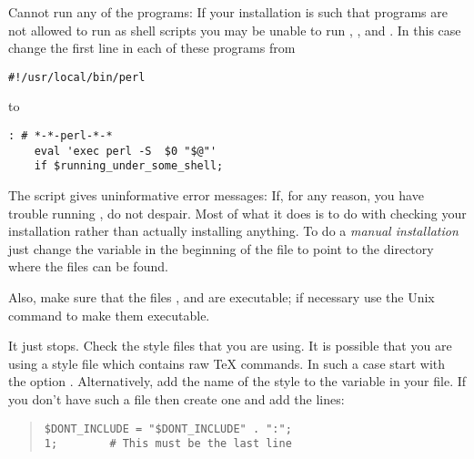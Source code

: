 \begin{htmllist}
\item [Cannot run any of the \Perl{} programs: ]
If your \Perl{} installation is such that \Perl{} programs are not allowed
to run as shell scripts you may be unable to run
, ,  and  .
In this case change the first line in each of these
programs from
\begin{small}
\begin{verbatim}
#!/usr/local/bin/perl
\end{verbatim}
\end{small}%
to
\begin{small}%
\begin{verbatim}
: # *-*-perl-*-*
    eval 'exec perl -S  $0 "$@"'
    if $running_under_some_shell;
\end{verbatim}
\end{small}

\item [The \fn{install-test} script gives uninformative error messages: ]
If, for any reason, you have trouble running ,
do not despair. Most of what it does is to do with checking
your installation rather than actually installing anything.
To do a \textit{manual installation} just change the variable
 in the beginning of the file 
to point to the directory where the \latextohtml{} files can be found.

Also, make sure that the files
,  and  are executable;
if necessary use the Unix  command to make them
executable.

\item [It just stops. ] Check the style
files that you are using. It is possible that you are using
a style file which contains raw \TeX{} commands. In such a case
start \latextohtml{} with the option
.
Alternatively, add the name of the style to the variable
 in your
 file. If you don't have such a file then
create one and add the lines:
\begin{quote}
\begin{small}
\verb|$DONT_INCLUDE = "$DONT_INCLUDE" . ":|\verb|";|\\
\verb|1;        # This must be the last line|
\end{small}
\end{quote}


\end{htmllist}
